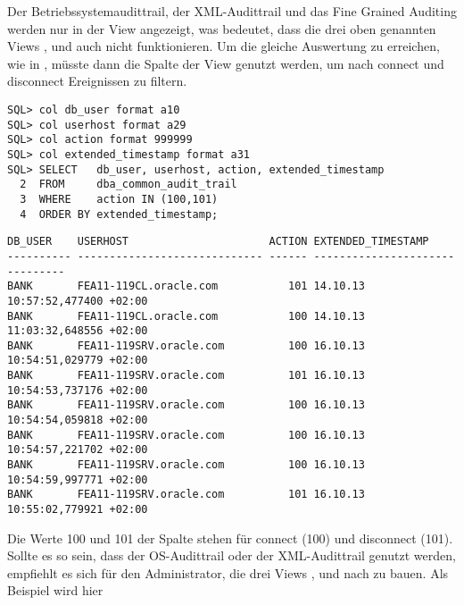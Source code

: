         Der Betriebssystemaudittrail, der XML-Audittrail und das Fine Grained
        Auditing werden nur in der View 
        angezeigt, was bedeutet, dass die drei oben genannten Views
        ,  und
        auch   nicht funktionieren. Um die
        gleiche Auswertung zu erreichen, wie in , müsste
        dann die Spalte  der View
         genutzt werden, um nach connect
        und disconnect Ereignissen zu filtern.
        \begin{lstlisting}[caption={Einen externen Audittrail auswerten},label=admin816,language=oracle_sql,alsolanguage=sqlplus]
SQL> col db_user format a10
SQL> col userhost format a29
SQL> col action format 999999
SQL> col extended_timestamp format a31
SQL> SELECT   db_user, userhost, action, extended_timestamp
  2  FROM     dba_common_audit_trail
  3  WHERE    action IN (100,101)
  4  ORDER BY extended_timestamp;
        \end{lstlisting}
\clearpage
        \begin{lstlisting}[caption={Einen externen Audittrail auswerten - Fortsetzung},language=oracle_sql,alsolanguage=sqlplus]
DB_USER    USERHOST                      ACTION EXTENDED_TIMESTAMP
---------- ----------------------------- ------ -------------------------------
BANK       FEA11-119CL.oracle.com           101 14.10.13 10:57:52,477400 +02:00
BANK       FEA11-119CL.oracle.com           100 14.10.13 11:03:32,648556 +02:00
BANK       FEA11-119SRV.oracle.com          100 16.10.13 10:54:51,029779 +02:00
BANK       FEA11-119SRV.oracle.com          101 16.10.13 10:54:53,737176 +02:00
BANK       FEA11-119SRV.oracle.com          100 16.10.13 10:54:54,059818 +02:00
BANK       FEA11-119SRV.oracle.com          100 16.10.13 10:54:57,221702 +02:00
BANK       FEA11-119SRV.oracle.com          100 16.10.13 10:54:59,997771 +02:00
BANK       FEA11-119SRV.oracle.com          101 16.10.13 10:55:02,779921 +02:00
        \end{lstlisting}
        Die Werte 100 und 101 der Spalte  stehen für
        connect (100) und disconnect (101). Sollte es so sein, dass der
        OS-Audittrail oder der XML-Audittrail genutzt werden, empfiehlt es sich
        für den Administrator, die drei Views
        ,  und
         nach zu bauen. Als Beispiel wird hier
